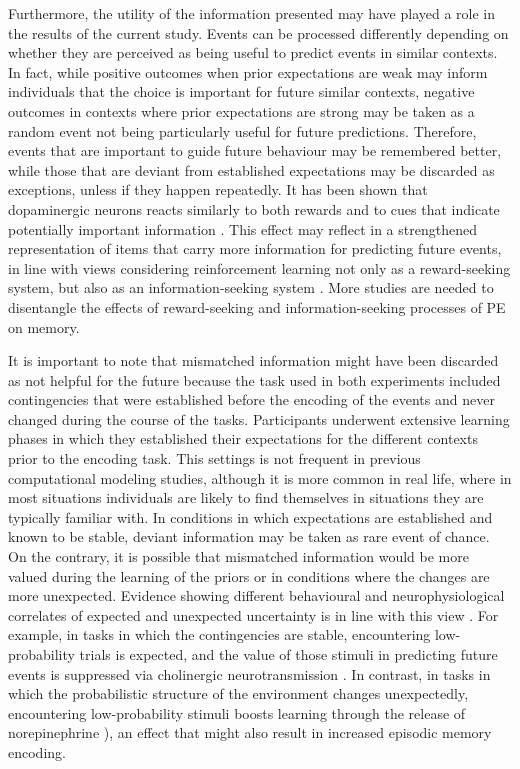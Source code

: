 \documentclass[a4paper,12pt]{article}
\begin{document}
Furthermore, the utility of the information presented may have played a role in the results of the current study. Events can be processed differently depending on whether they are perceived as being useful to predict events in similar contexts. In fact, while positive outcomes when prior expectations are weak may inform individuals that the choice is important for future similar contexts, negative outcomes in contexts where prior expectations are strong may be taken as a random event not being particularly useful for future predictions. Therefore, events that are important to guide future behaviour may be remembered better, while those that are deviant from established expectations may be discarded as exceptions, unless if they happen repeatedly. It has been shown that dopaminergic neurons reacts similarly to both rewards and to cues that indicate potentially important information \citep{bromberg2011lateral}. This effect may reflect in a strengthened representation of items that carry more information for predicting future events, in line with views considering reinforcement learning not only as a reward-seeking system, but also as an information-seeking system \citep{bromberg2011lateral, Niv2011}. More studies are needed to disentangle the effects of reward-seeking and information-seeking processes of PE on memory. \par
It is important to note that mismatched information might have been discarded as not helpful for the future because the task used in both experiments included contingencies that were established before the encoding of the events and never changed during the course of the tasks. Participants underwent extensive learning phases in which they established their expectations for the different contexts prior to the encoding task. This settings is not frequent in previous computational modeling studies, although it is more common in real life, where in most situations individuals are likely to find themselves in situations they are typically familiar with. In conditions in which expectations are established and known to be stable, deviant information may be taken as rare event of chance. On the contrary, it is possible that mismatched information would be more valued during the learning of the priors or in conditions where the changes are more unexpected. Evidence showing different behavioural and neurophysiological correlates of expected and unexpected uncertainty is in line with this view \citep{Yu2005}. For example, in tasks in which the contingencies are stable, encountering low-probability trials is expected, and the value of those stimuli in predicting future events is suppressed via cholinergic neurotransmission \citep{witte1997effects}. In contrast, in tasks in which the probabilistic structure of the environment changes unexpectedly, encountering low-probability stimuli boosts learning through the release of norepinephrine \cite{Yu2005}), an effect that might also result in increased episodic memory encoding. 
\end{document}
